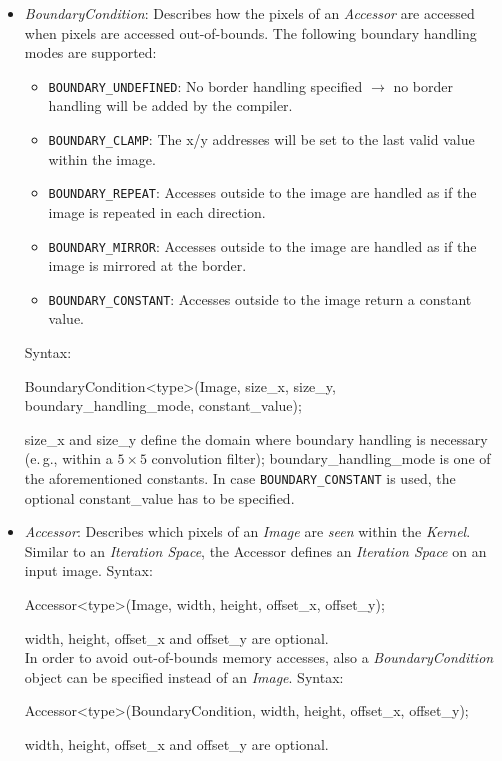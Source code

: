 \begin{itemize}
    \item {\em BoundaryCondition}:
    Describes how the pixels of an {\em Accessor} are accessed when pixels are
    accessed out-of-bounds. The following boundary handling modes are supported:
    \begin{itemize}
        \item {\tt BOUNDARY\_UNDEFINED}: No border handling specified $\rightarrow$ no border handling will be added by the compiler.
        \item {\tt BOUNDARY\_CLAMP}: The x/y addresses will be set to the last valid value within the image.
        \item {\tt BOUNDARY\_REPEAT}: Accesses outside to the image are handled as if the image is repeated in each direction.
        \item {\tt BOUNDARY\_MIRROR}: Accesses outside to the image are handled as if the image is mirrored at the border.
        \item {\tt BOUNDARY\_CONSTANT}: Accesses outside to the image return a constant value.
    \end{itemize}
    Syntax:
\begin{code}
BoundaryCondition<type>(Image, size_x, size_y, boundary_handling_mode, constant_value);
\end{code}
    size\_x and size\_y define the domain where boundary handling is necessary
    (e.\,g., within a $5\times5$ convolution filter); boundary\_handling\_mode
    is one of the aforementioned constants. In case {\tt BOUNDARY\_CONSTANT} is
    used, the optional constant\_value has to be specified.

    \item {\em Accessor}:
    Describes which pixels of an {\em Image} are {\em seen} within the {\em
    Kernel}. Similar to an {\em Iteration Space}, the Accessor defines an {\em
    Iteration Space} on an input image. Syntax:\\
\begin{code}
Accessor<type>(Image, width, height, offset_x, offset_y);
\end{code}
    width, height, offset\_x and offset\_y are optional.\\

    In order to avoid out-of-bounds memory accesses, also a {\em
    BoundaryCondition} object can be specified instead of an {\em Image}.
    Syntax:\\
\begin{code}
Accessor<type>(BoundaryCondition, width, height, offset_x, offset_y);
\end{code}
    width, height, offset\_x and offset\_y are optional.\\


\end{itemize}
